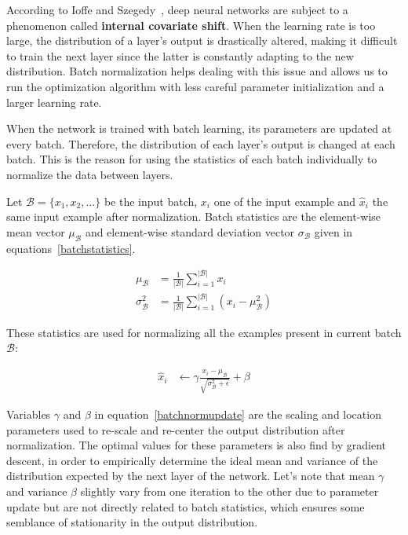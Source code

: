         According to Ioffe and Szegedy~\cite{DBLP:journals/corr/IoffeS15}, deep neural networks are subject to a phenomenon
        called \textbf{internal covariate shift}. When the learning rate is too large, the distribution of a layer's output
        is drastically altered, making it difficult to train the next layer since the latter is constantly adapting to the new
        distribution. Batch normalization helps dealing with this issue and allows us to run the optimization algorithm with less
        careful parameter initialization and a larger learning rate.

        When the network is trained with batch learning, its parameters are updated at every batch. Therefore, the distribution
        of each layer's output is changed at each batch. This is the reason for using the statistics of each batch individually
        to normalize the data between layers.

        Let $\mathcal{B} = \{ x_1, x_2, \dotsc \}$ be the input batch, $x_i$ one of the input example and $\hat{x}_i$ the same
        input example after normalization. Batch statistics are the element-wise mean vector $\mu_{\mathcal{B}}$ and
        element-wise standard deviation vector $\sigma_{\mathcal{B}}$ given in equations~\ref{batchstatistics}.

        \begin{equation}\label{batchstatistics}
            \begin{split}
                \mu_{\mathcal{B}} & = \frac{1}{\vert\mathcal{B}\vert} \sum\limits_{i=1}^{\vert\mathcal{B}\vert} x_i \\
                \sigma_{\mathcal{B}}^2 & = \frac{1}{\vert\mathcal{B}\vert} \sum\limits_{i=1}^{\vert\mathcal{B}\vert} (x_i - \mu_{\mathcal{B}}^2)
            \end{split}
        \end{equation}

        These statistics are used for normalizing all the examples present in current batch $\mathcal{B}$:

        \begin{equation}\label{batchnormupdate}
            \begin{split}
                \hat{x}_i & \leftarrow \gamma \frac{x_i - \mu_{\mathcal{B}}}{\sqrt{\sigma_{\mathcal{B}}^2 + \epsilon}} + \beta
            \end{split}
        \end{equation}

        Variables $\gamma$ and $\beta$ in equation~\ref{batchnormupdate} are the scaling and location parameters
        used to re-scale and re-center the output distribution after normalization. The optimal values for these
        parameters is also find by gradient descent, in order to empirically determine the ideal mean and variance
        of the distribution expected by the next layer of the network.
        Let's note that mean $\gamma$ and variance $\beta$ slightly vary from one iteration to the other due to
        parameter update but are not directly related to batch statistics, which ensures some semblance of
        stationarity in the output distribution.

